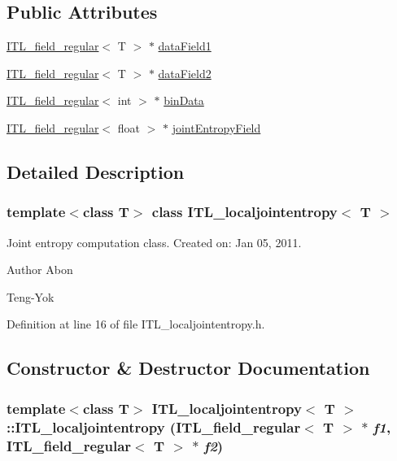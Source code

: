 \subsection*{Public Attributes}
\begin{DoxyCompactItemize}
\item 
\hyperlink{classITL__field__regular}{ITL\_\-field\_\-regular}$<$ T $>$ $\ast$ \hyperlink{classITL__localjointentropy_a8ff2f16dad74ac2c1e6d9e2669c49990}{dataField1}
\item 
\hyperlink{classITL__field__regular}{ITL\_\-field\_\-regular}$<$ T $>$ $\ast$ \hyperlink{classITL__localjointentropy_a68b8981e78713334160e6c1c0dd522ff}{dataField2}
\item 
\hyperlink{classITL__field__regular}{ITL\_\-field\_\-regular}$<$ int $>$ $\ast$ \hyperlink{classITL__localjointentropy_a3464cac89446ff42d3c39a703f7e35fe}{binData}
\item 
\hyperlink{classITL__field__regular}{ITL\_\-field\_\-regular}$<$ float $>$ $\ast$ \hyperlink{classITL__localjointentropy_a374226ab54b6d5cf039a4d8ed99bc07f}{jointEntropyField}
\end{DoxyCompactItemize}


\subsection{Detailed Description}
\subsubsection*{template$<$class T$>$ class ITL\_\-localjointentropy$<$ T $>$}

Joint entropy computation class. Created on: Jan 05, 2011. \begin{DoxyAuthor}{Author}
Abon 

Teng-\/Yok 
\end{DoxyAuthor}


Definition at line 16 of file ITL\_\-localjointentropy.h.



\subsection{Constructor \& Destructor Documentation}
\hypertarget{classITL__localjointentropy_a5e579f10a227887be6f31d7b3c8f6264}{
\subsubsection[{ITL\_\-localjointentropy}]{\setlength{\rightskip}{0pt plus 5cm}template$<$class T$>$ {\bf ITL\_\-localjointentropy}$<$ T $>$::{\bf ITL\_\-localjointentropy} ({\bf ITL\_\-field\_\-regular}$<$ T $>$ $\ast$ {\em f1}, \/  {\bf ITL\_\-field\_\-regular}$<$ T $>$ $\ast$ {\em f2})}}
\label{classITL__localjointentropy_a5e579f10a227887be6f31d7b3c8f6264}



